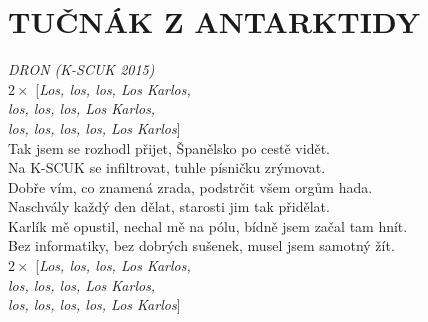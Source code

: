 \section*{\Huge TUČNÁK Z ANTARKTIDY}
\emph{DRON (K-SCUK 2015)}\\

$2\times$ [\emph{Los, los, los, Los Karlos,\\
los, los, los, Los Karlos,\\
los, los, los, los, Los Karlos}]\\

Tak jsem se rozhodl přijet, Španělsko po cestě vidět.\\
Na K-SCUK se infiltrovat, tuhle písničku zrýmovat.\\

Dobře vím, co znamená zrada, podstrčit všem orgům hada.\\
Naschvály každý den dělat, starosti jim tak přidělat.\\

Karlík mě opustil, nechal mě na pólu, bídně jsem začal tam hnít.\\
Bez informatiky, bez dobrých sušenek, musel jsem samotný žít.\\

$2\times$ [\emph{Los, los, los, Los Karlos,\\
los, los, los, Los Karlos,\\
los, los, los, los, Los Karlos}]

\newpage
